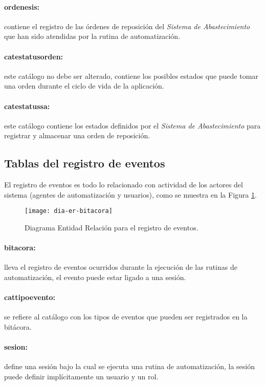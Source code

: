 \paragraph{ordenes{\textunderscore}is:} contiene el registro de las órdenes de reposición del \textit{Sistema de Abastecimiento} que han sido atendidas por la rutina de automatización.
\paragraph{cat{\textunderscore}estatus{\textunderscore}orden:} este catálogo no debe ser alterado, contiene los posibles estados que puede tomar una orden durante el ciclo de vida de la aplicación.
\paragraph{cat{\textunderscore}estatus{\textunderscore}sa:} este catálogo contiene los estados definidos por el \textit{Sistema de Abastecimiento} para registrar y almacenar una orden de reposición.


\subsection{Tablas del registro de eventos}
El registro de eventos es todo lo relacionado con actividad de los actores del sistema (agentes de automatización y usuarios), como se muestra en la Figura \ref{fig:dia-er-bitacora}.
\begin{figure}[h]
  \centering
  \texttt{[image: dia-er-bitacora]} 
  \caption{Diagrama Entidad Relación para el registro de eventos.}
  \label{fig:dia-er-bitacora}
\end{figure}
\paragraph{bitacora:} lleva el registro de eventos ocurridos durante la ejecución de las rutinas de automatización, el evento puede estar ligado a una sesión.
\paragraph{cat{\textunderscore}tipo{\textunderscore}evento:} se refiere al catálogo con los tipos de eventos que pueden ser registrados en la bitácora.
\paragraph{sesion:} define una sesión bajo la cual se ejecuta una rutina de automatización, la sesión puede definir implícitamente un usuario y un rol.


